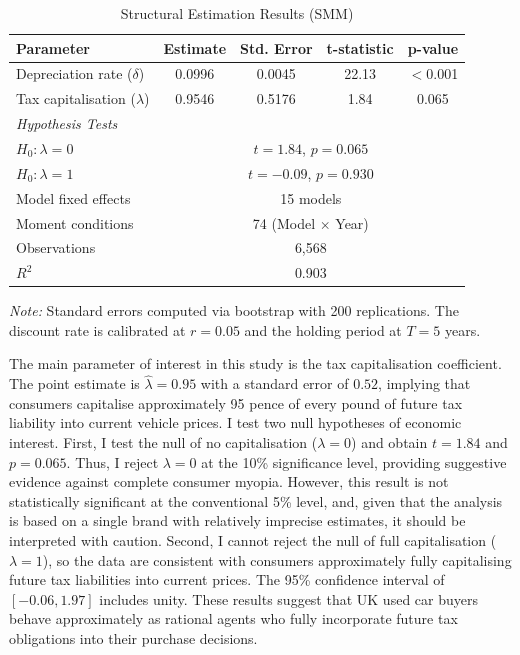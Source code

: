 \documentclass[12pt, a4paper]{article}
\begin{document}
\begin{table}[ht]
    \centering
    \caption{Structural Estimation Results (SMM)}
    \label{tab:smm_results}
    \begin{threeparttable}
    \begin{tabular}{lcccc}
        \toprule
        Parameter & Estimate & Std. Error & t-statistic & p-value \\
        \midrule
        Depreciation rate ($\delta$) & 0.0996 & 0.0045 & 22.13 & $<$0.001 \\
        Tax capitalisation ($\lambda$) & 0.9546 & 0.5176 & 1.84 & 0.065 \\
        \midrule
        \multicolumn{5}{l}{\textit{Hypothesis Tests}} \\
        $H_0: \lambda = 0$ & \multicolumn{4}{c}{$t = 1.84$, $p = 0.065$} \\
        $H_0: \lambda = 1$ & \multicolumn{4}{c}{$t = -0.09$, $p = 0.930$} \\
        \midrule
        Model fixed effects & \multicolumn{4}{c}{15 models} \\
        Moment conditions & \multicolumn{4}{c}{74 (Model $\times$ Year)} \\
        Observations & \multicolumn{4}{c}{6,568} \\
        $R^2$ & \multicolumn{4}{c}{0.903} \\
        \bottomrule
    \end{tabular}
    \begin{tablenotes}
        \small
        \item \textit{Note:} Standard errors computed via bootstrap with 200 replications. The discount rate is calibrated at $r = 0.05$ and the holding period at $T = 5$ years.
    \end{tablenotes}
    \end{threeparttable}
\end{table}

The main parameter of interest in this study is the tax capitalisation coefficient. The point estimate is $\hat{\lambda} = 0.95$ with a standard error of $0.52$, implying that consumers capitalise approximately 95 pence of every pound of future tax liability into current vehicle prices. I test two null hypotheses of economic interest. First, I test the null of no capitalisation ($\lambda = 0$) and obtain $t = 1.84$ and $p = 0.065$. Thus, I reject $\lambda = 0$ at the 10\% significance level, providing suggestive evidence against complete consumer myopia. However, this result is not statistically significant at the conventional 5\% level, and, given that the analysis is based on a single brand with relatively imprecise estimates, it should be interpreted with caution. Second, I cannot reject the null of full capitalisation ($\lambda = 1$), so the data are consistent with consumers approximately fully capitalising future tax liabilities into current prices. The 95\% confidence interval of $[-0.06, 1.97]$ includes unity. These results suggest that UK used car buyers behave approximately as rational agents who fully incorporate future tax obligations into their purchase decisions.
\end{document}
